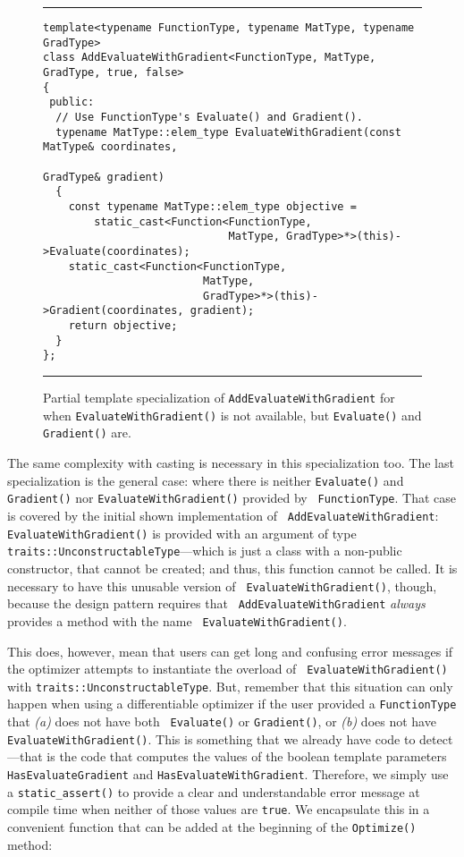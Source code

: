 \begin{figure}[t!]
\hrule
\vspace{1ex}
\begin{verbatim}
template<typename FunctionType, typename MatType, typename GradType>
class AddEvaluateWithGradient<FunctionType, MatType, GradType, true, false>
{
 public:
  // Use FunctionType's Evaluate() and Gradient().
  typename MatType::elem_type EvaluateWithGradient(const MatType& coordinates,
                                                   GradType& gradient)
  {
    const typename MatType::elem_type objective =
        static_cast<Function<FunctionType,
                             MatType, GradType>*>(this)->Evaluate(coordinates);
    static_cast<Function<FunctionType,
                         MatType,
                         GradType>*>(this)->Gradient(coordinates, gradient);
    return objective;
  }
};
\end{verbatim}
\hrule
\vspace*{-0.5em}
\caption{Partial template specialization of {\tt AddEvaluateWithGradient} for
when {\tt EvaluateWithGradient()} is not available, but {\tt Evaluate()} and
{\tt Gradient()} are.}
\label{fig:aewg-s2}
\end{figure}

The same complexity with casting is necessary in this specialization too.  The
last specialization is the general case: where there is neither {\tt Evaluate()}
and {\tt Gradient()} nor {\tt EvaluateWithGradient()} provided by {\tt
FunctionType}.  That case is covered by the initial shown implementation of {\tt
AddEvaluateWithGradient}: {\tt EvaluateWithGradient()} is provided with an
argument of type {\tt traits::UnconstructableType}---which is just a class with
a non-public constructor, that cannot be created; and thus, this function cannot
be called.  It is necessary to have this unusable version of {\tt
EvaluateWithGradient()}, though, because the design pattern requires that {\tt
AddEvaluateWithGradient} {\em always} provides a method with the name {\tt
EvaluateWithGradient()}.

This does, however, mean that users can get long and confusing error messages if
the optimizer attempts to instantiate the overload of {\tt
EvaluateWithGradient()} with {\tt traits::UnconstructableType}.  But, remember
that this situation can only happen when using a differentiable optimizer if
the user provided a {\tt FunctionType} that {\it (a)} does not have both {\tt
Evaluate()} or {\tt Gradient()}, or {\it (b)} does not have {\tt
EvaluateWithGradient()}.  This is something that we already have code to
detect---that is the code that computes the values of the boolean template
parameters {\tt HasEvaluateGradient} and {\tt HasEvaluateWithGradient}.
Therefore, we simply use a {\tt static\_assert()} to provide a clear and
understandable error message at compile time when neither of those values are
{\tt true}.  We encapsulate this in a convenient function that can be added at
the beginning of the {\tt Optimize()} method:

